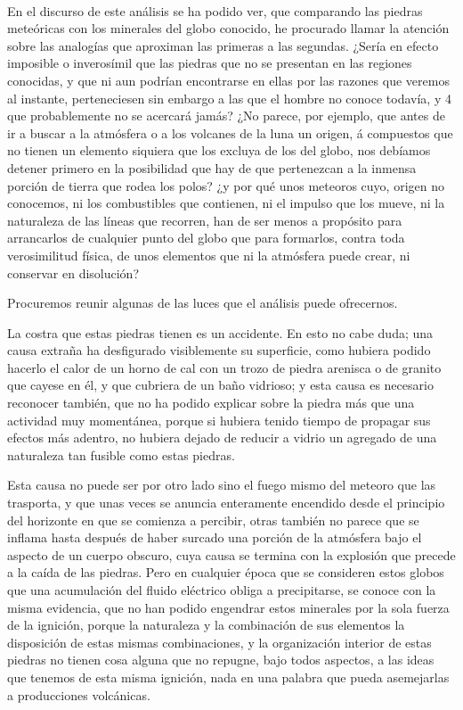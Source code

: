\documentclass[a4paper, 11pt, oneside, polutonikogreek, spanish]{article}
\begin{document}
\paragraph{}
En el discurso de este análisis se ha podido ver, que comparando las piedras meteóricas con los minerales del globo conocido, he procurado llamar la atención sobre las analogías que aproximan las primeras a las segundas. ¿Sería en efecto imposible o inverosímil que las piedras que no se presentan en las regiones conocidas, y que ni aun podrían encontrarse en ellas por las razones que veremos al instante, perteneciesen sin embargo a las que el hombre no conoce todavía, y 4 que probablemente no se acercará jamás? ¿No parece, por ejemplo, que antes de ir a buscar a la atmósfera o a los volcanes de la luna un origen, á compuestos que no tienen un elemento siquiera que los excluya de los del globo, nos debíamos detener primero en la posibilidad que hay de que pertenezcan a la inmensa porción de tierra que rodea los polos? ¿y por qué unos meteoros cuyo, origen no conocemos, ni los combustibles que contienen, ni el impulso que los mueve, ni la naturaleza de las líneas que recorren, han de ser menos a propósito para arrancarlos de cualquier punto del globo que para formarlos, contra toda verosimilitud física, de unos elementos que ni la atmósfera puede crear, ni conservar en disolución?

Procuremos reunir algunas de las luces que el análisis puede ofrecernos.

La costra que estas piedras tienen es un accidente. En esto no cabe duda; una causa extraña ha desfigurado visiblemente su superficie, como hubiera podido hacerlo el calor de un horno de cal con un trozo de piedra arenisca o de granito que cayese en él, y que cubriera de un baño vidrioso; y esta causa es necesario reconocer también, que no ha podido explicar sobre la piedra más que una actividad muy momentánea, porque si hubiera tenido tiempo de propagar sus efectos más adentro, no hubiera dejado de reducir a vidrio un agregado de una naturaleza tan fusible como estas piedras.

Esta causa no puede ser por otro lado sino el fuego mismo del meteoro que las trasporta, y que unas veces se anuncia enteramente encendido desde el principio del horizonte en que se comienza a percibir, otras también no parece que se inflama hasta después de haber surcado una porción de la atmósfera bajo el aspecto de un cuerpo obscuro, cuya causa se termina con la explosión que precede a la caída de las piedras. Pero en cualquier época que se consideren estos globos que una acumulación del fluido eléctrico obliga a precipitarse, se conoce con la misma evidencia, que no han podido engendrar estos minerales por la sola fuerza de la ignición, porque la naturaleza y la combinación de sus elementos la disposición de estas mismas combinaciones, y la organización interior de estas piedras no tienen cosa alguna que no repugne, bajo todos aspectos, a las ideas que tenemos de esta misma ignición, nada en una palabra que pueda asemejarlas a producciones volcánicas.
\end{document}
